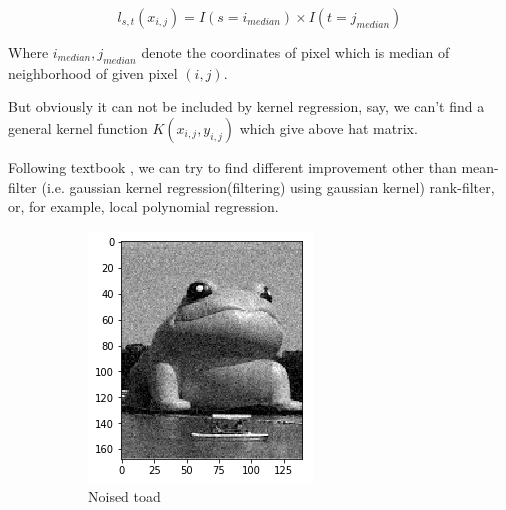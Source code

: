 \documentclass{article}
\begin{document}
$$ 
l_{s,t}(x_{i,j}) = I(s=i_{median}) \times I(t=j_{median}) 
$$

Where $i_{median},j_{median}$ denote the coordinates of pixel which is median of neighborhood of given pixel $(i,j)$.

But obviously it can not be included by kernel regression, say, 
we can't find a general kernel function $K(x_{i,j},y_{i,j})$ which give above hat matrix. 

Following textbook \cite{wasserman2006all}, we can try to find different improvement other than mean-filter 
(i.e. gaussian kernel regression(filtering) using gaussian kernel) rank-filter, or, 
for example, local polynomial regression. 

\begin{figure}[htb]
  \centering
  \begin{subfigure}[b]{0.24\linewidth}
    \includegraphics[width=\linewidth]{images/noise_removal_1.png}
    \caption{Noised toad}
  \end{subfigure}
  \begin{subfigure}[b]{0.24\linewidth}

\end{subfigure}
\end{figure}
\end{document}
